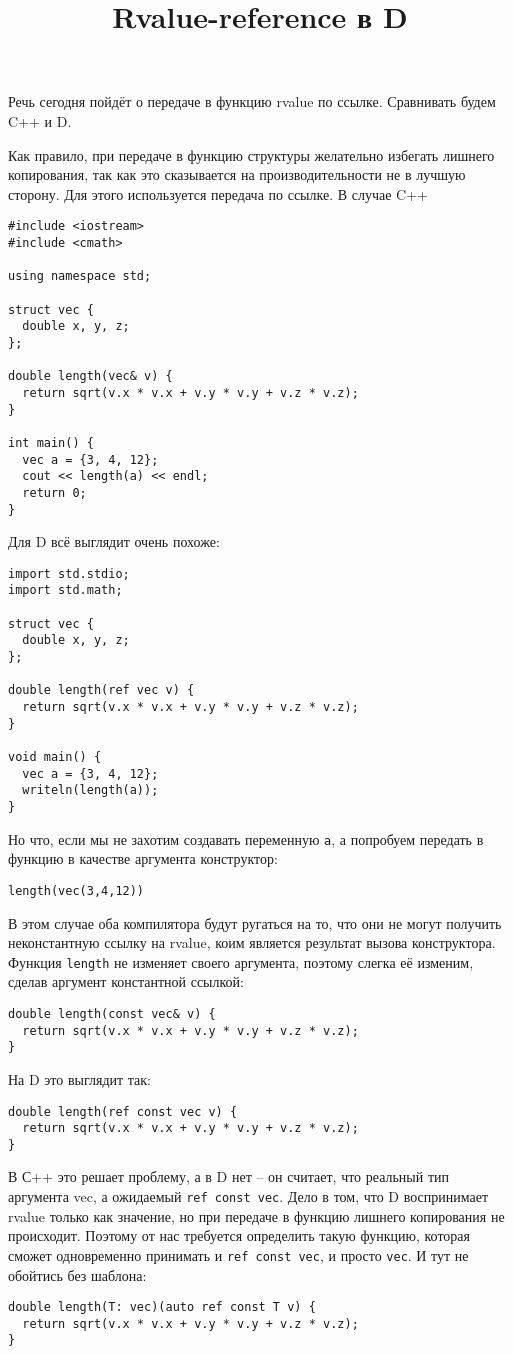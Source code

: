 \documentclass{ncc}
\title{Rvalue-reference в D}
\begin{document}
\maketitle

Речь сегодня пойдёт о передаче в функцию rvalue по ссылке. Сравнивать будем C++ и D.

Как правило, при передаче в функцию структуры желательно избегать лишнего копирования, так как это сказывается на производительности не в лучшую сторону. Для этого используется передача по ссылке. В случае C++
\begin{verbatim}
#include <iostream>
#include <cmath>

using namespace std;

struct vec {
  double x, y, z;
};

double length(vec& v) {
  return sqrt(v.x * v.x + v.y * v.y + v.z * v.z);
}

int main() {
  vec a = {3, 4, 12};
  cout << length(a) << endl;
  return 0;
}
\end{verbatim}
Для D всё выглядит очень похоже:
\begin{verbatim}
import std.stdio;
import std.math;

struct vec {
  double x, y, z;
};

double length(ref vec v) {
  return sqrt(v.x * v.x + v.y * v.y + v.z * v.z);
}

void main() {
  vec a = {3, 4, 12};
  writeln(length(a));
}
\end{verbatim}
Но что, если мы не захотим создавать переменную \texttt{a}, а попробуем передать в функцию в качестве аргумента конструктор:
\begin{verbatim}
length(vec(3,4,12))
\end{verbatim}
В этом случае оба компилятора будут ругаться на то, что они не могут получить неконстантную ссылку на rvalue, коим является результат вызова конструктора. Функция \texttt{length} не изменяет своего аргумента, поэтому слегка её изменим, сделав аргумент константной ссылкой:
\begin{verbatim}
double length(const vec& v) {
  return sqrt(v.x * v.x + v.y * v.y + v.z * v.z);
}
\end{verbatim}
На D это выглядит так:
\begin{verbatim}
double length(ref const vec v) {
  return sqrt(v.x * v.x + v.y * v.y + v.z * v.z);
}
\end{verbatim}
В С++ это решает проблему, а в D нет -- он считает, что реальный тип аргумента vec, а ожидаемый \texttt{ref const vec}. Дело в том, что D воспринимает rvalue только как значение, но при передаче в функцию лишнего копирования не происходит. Поэтому от нас требуется определить такую функцию, которая сможет одновременно принимать и \texttt{ref const vec}, и просто \texttt{vec}. И тут не обойтись без шаблона:
\begin{verbatim}
double length(T: vec)(auto ref const T v) {
  return sqrt(v.x * v.x + v.y * v.y + v.z * v.z);
}
\end{verbatim}
\end{document}
